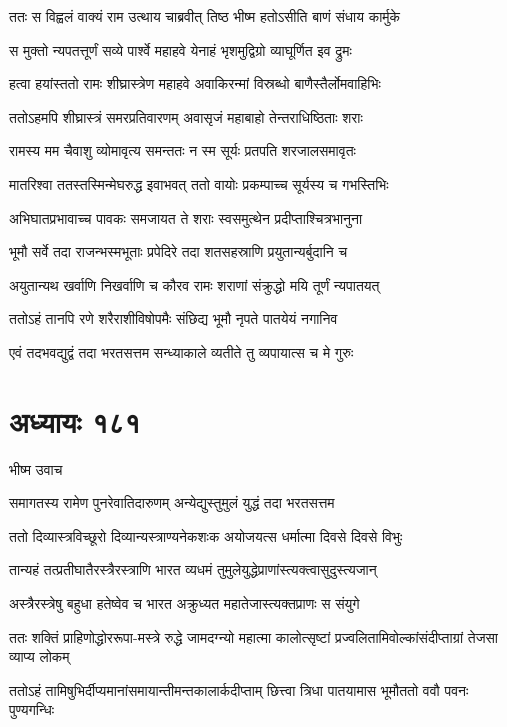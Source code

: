 \twolineshloka
{ततः स विह्वलं वाक्यं राम उत्थाय चाब्रवीत्}
{तिष्ठ भीष्म हतोऽसीति बाणं संधाय कार्मुके}


\twolineshloka
{स मुक्तो न्यपतत्तूर्णं सव्ये पार्श्वे महाहवे}
{येनाहं भृशमुद्विग्रो व्याघूर्णित इव द्रुमः}


\twolineshloka
{हत्वा हयांस्ततो रामः शीघ्रास्त्रेण महाहवे}
{अवाकिरन्मां विस्रब्धो बाणैस्तैर्लोमवाहिभिः}


\twolineshloka
{ततोऽहमपि शीघ्रास्त्रं समरप्रतिवारणम्}
{अवासृजं महाबाहो तेन्तराधिष्ठिताः शराः}


\twolineshloka
{रामस्य मम चैवाशु व्योमावृत्य समन्ततः}
{न स्म सूर्यः प्रतपति शरजालसमावृतः}


\twolineshloka
{मातरिश्वा ततस्तस्मिन्मेघरुद्ध इवाभवत्}
{ततो वायोः प्रकम्पाच्च सूर्यस्य च गभस्तिभिः}


\twolineshloka
{अभिघातप्रभावाच्च पावकः समजायत}
{ते शराः स्वसमुत्थेन प्रदीप्ताश्चित्रभानुना}


\twolineshloka
{भूमौ सर्वे तदा राजन्भस्मभूताः प्रपेदिरे}
{तदा शतसहस्राणि प्रयुतान्यर्बुदानि च}


\twolineshloka
{अयुतान्यथ खर्वाणि निखर्वाणि च कौरव}
{रामः शराणां संक्रुद्धो मयि तूर्णं न्यपातयत्}


\twolineshloka
{ततोऽहं तानपि रणे शरैराशीविषोपमैः}
{संछिद्य भूमौ नृपते पातयेयं नगानिव}


\twolineshloka
{एवं तदभवद्युद्वं तदा भरतसत्तम}
{सन्ध्याकाले व्यतीते तु व्यपायात्स च मे गुरुः}


\chapter{अध्यायः १८१}
\twolineshloka
{भीष्म उवाच}
{}


\twolineshloka
{समागतस्य रामेण पुनरेवातिदारुणम्}
{अन्येद्युस्तुमुलं युद्धं तदा भरतसत्तम}


\twolineshloka
{ततो दिव्यास्त्रविच्छूरो दिव्यान्यस्त्राण्यनेकशःक}
{अयोजयत्स धर्मात्मा दिवसे दिवसे विभुः}


\twolineshloka
{तान्यहं तत्प्रतीघातैरस्त्रैरस्त्राणि भारत}
{व्यधमं तुमुलेयुद्धेप्राणांस्त्यक्त्वासुदुस्त्यजान्}


\twolineshloka
{अस्त्रैरस्त्रेषु बहुधा हतेष्वेव च भारत}
{अक्रुध्यत महातेजास्त्यक्तप्राणः स संयुगे}


\twolineshloka
{ततः शक्तिं प्राहिणोद्धोररूपा-मस्त्रे रुद्धे जामदग्न्यो महात्मा}
{कालोत्सृष्टां प्रज्वलितामिवोल्कांसंदीप्ताग्रां तेजसा व्याप्य लोकम्}


\twolineshloka
{ततोऽहं तामिषुभिर्दीप्यमानांसमायान्तीमन्तकालार्कदीप्ताम्}
{छित्त्वा त्रिधा पातयामास भूमौततो ववौ पवनः पुण्यगन्धिः}


